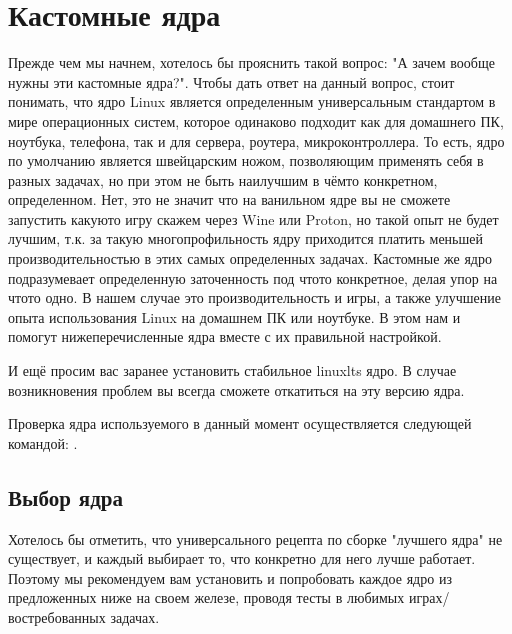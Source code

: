 \documentclass[letterpaper,10pt,russian,openany]{sphinxmanual}
\begin{document}
\chapter{Кастомные ядра}
\label{\detokenize{source/custom-kernels:custom-kernels}}\label{\detokenize{source/custom-kernels:id1}}\label{\detokenize{source/custom-kernels::doc}}
\sphinxAtStartPar
Прежде чем мы начнем, хотелось бы прояснить такой вопрос: "А зачем вообще нужны эти кастомные ядра?".
Чтобы дать ответ на данный вопрос, стоит понимать, что ядро Linux является определенным универсальным стандартом в мире
операционных систем, которое одинаково подходит как для домашнего ПК, ноутбука, телефона, так и для сервера, роутера, микро\sphinxhyphen{}контроллера.
То есть, ядро по умолчанию является швейцарским ножом, позволяющим применять себя в разных задачах,
но при этом не быть наилучшим в чём\sphinxhyphen{}то конкретном, определенном.
Нет, это не значит что на ванильном ядре вы не сможете запустить какую\sphinxhyphen{}то игру скажем через Wine или Proton,
но такой опыт не будет лучшим, т.к. за такую многопрофильность ядру приходится платить меньшей производительностью в этих самых определенных задачах.
Кастомные же ядро подразумевает определенную заточенность под что\sphinxhyphen{}то конкретное,
делая упор на что\sphinxhyphen{}то одно. В нашем случае это производительность и игры, а также улучшение опыта использования Linux на домашнем
ПК или ноутбуке. В этом нам и помогут нижеперечисленные ядра вместе с их правильной настройкой.

\sphinxAtStartPar
И ещё просим вас заранее установить стабильное linux\sphinxhyphen{}lts ядро.
В случае возникновения проблем вы всегда сможете откатиться на эту версию ядра.

\sphinxAtStartPar
Проверка ядра используемого в данный момент осуществляется следующей командой: .

\ignorespaces 

\section{Выбор ядра}
\label{\detokenize{source/custom-kernels:kernel-choose}}\label{\detokenize{source/custom-kernels:index-0}}\label{\detokenize{source/custom-kernels:id2}}
\sphinxAtStartPar
Хотелось бы отметить, что универсального рецепта по сборке "лучшего ядра" не существует,
и каждый выбирает то, что конкретно для него лучше работает. Поэтому мы рекомендуем вам
установить и попробовать каждое ядро из предложенных ниже на своем железе, проводя тесты
в любимых играх/востребованных задачах.
\end{document}
